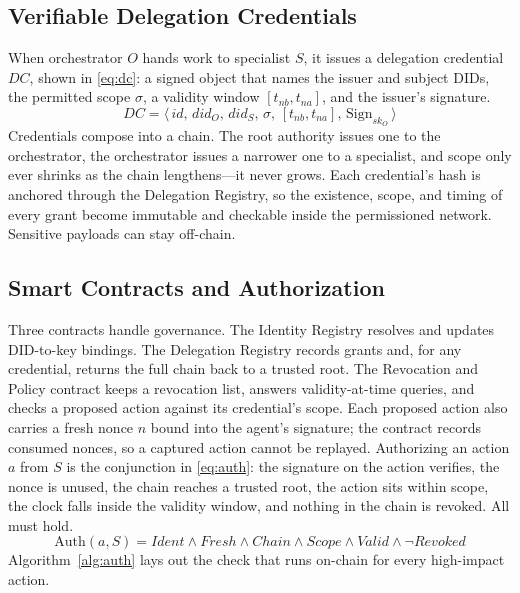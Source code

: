 \documentclass[conference]{IEEEtran}
\begin{document}
\subsection{Verifiable Delegation Credentials}
When orchestrator $O$ hands work to specialist $S$, it issues a delegation credential $DC$, shown in \eqref{eq:dc}: a signed object that names the issuer and subject DIDs, the permitted scope $\sigma$, a validity window $[t_{nb}, t_{na}]$, and the issuer's signature.
\begin{equation}\label{eq:dc}
DC = \langle\, \mathit{id},\, \mathit{did}_O,\, \mathit{did}_S,\, \sigma,\, [t_{nb}, t_{na}],\, \mathrm{Sign}_{sk_O} \,\rangle
\end{equation}
Credentials compose into a chain. The root authority issues one to the orchestrator, the orchestrator issues a narrower one to a specialist, and scope only ever shrinks as the chain lengthens---it never grows. Each credential's hash is anchored through the Delegation Registry, so the existence, scope, and timing of every grant become immutable and checkable inside the permissioned network. Sensitive payloads can stay off-chain.

\subsection{Smart Contracts and Authorization}
Three contracts handle governance. The Identity Registry resolves and updates DID-to-key bindings. The Delegation Registry records grants and, for any credential, returns the full chain back to a trusted root. The Revocation and Policy contract keeps a revocation list, answers validity-at-time queries, and checks a proposed action against its credential's scope. Each proposed action also carries a fresh nonce $n$ bound into the agent's signature; the contract records consumed nonces, so a captured action cannot be replayed. Authorizing an action $a$ from $S$ is the conjunction in \eqref{eq:auth}: the signature on the action verifies, the nonce is unused, the chain reaches a trusted root, the action sits within scope, the clock falls inside the validity window, and nothing in the chain is revoked. All must hold.
\begin{equation}\label{eq:auth}
\mathrm{Auth}(a,S) = \mathit{Ident} \wedge \mathit{Fresh} \wedge \mathit{Chain} \wedge \mathit{Scope} \wedge \mathit{Valid} \wedge \neg \mathit{Revoked}
\end{equation}
Algorithm~\ref{alg:auth} lays out the check that runs on-chain for every high-impact action.
\end{document}
